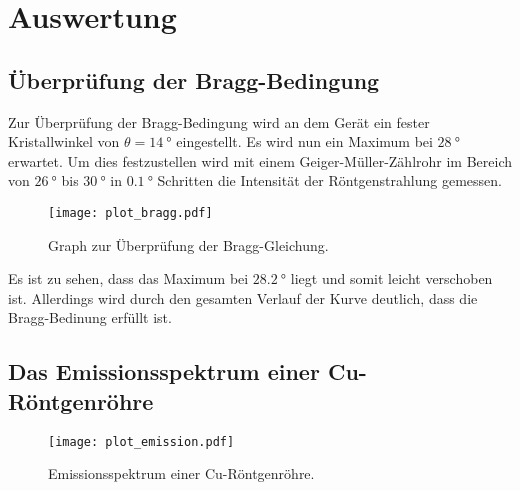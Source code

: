 \newpage
\section{Auswertung}
\label{sec:Auswertung}

\subsection{Überprüfung der Bragg-Bedingung}
Zur Überprüfung der Bragg-Bedingung wird an dem Gerät ein fester Kristallwinkel von
$\theta = \SI{14}{\degree}$ eingestellt. Es wird nun ein Maximum bei $\SI{28}{\degree}$
erwartet. Um dies festzustellen wird mit einem Geiger-Müller-Zählrohr im Bereich von
$\SI{26}{\degree}$ bis $\SI{30}{\degree}$ in $\SI{0.1}{\degree}$ Schritten die Intensität
der Röntgenstrahlung gemessen.

\begin{figure}[H]
  \centering
  \texttt{[image: plot\_bragg.pdf]}
  \caption{Graph zur Überprüfung der Bragg-Gleichung.}
  \label{fig:plot_a2}
\end{figure}

Es ist zu sehen, dass das Maximum bei $\SI{28.2}{\degree}$ liegt und somit leicht verschoben
ist. Allerdings wird durch den gesamten Verlauf der Kurve deutlich, dass die Bragg-Bedinung
erfüllt ist.


\subsection{Das Emissionsspektrum einer Cu-Röntgenröhre}

\begin{figure}[H]
  \centering
  \texttt{[image: plot\_emission.pdf]}
  \caption{Emissionsspektrum einer Cu-Röntgenröhre.}
  \label{fig:plot_a2}
\end{figure}
